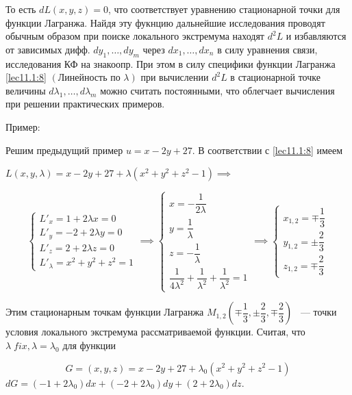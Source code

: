 \documentclass[../../main.tex]{subfiles}
\begin{document}
	То есть $dL\left( x, y, z \right) = 0$, что соответствует уравнению 
	стационарной точки для функции Лагранжа. Найдя эту фукнцию дальнейшие
	исследования проводят обычным образом при поиске локального экстремума 
	находят $d^2L$ и избавляются от зависимых дифф. $d y_1, \ldots, d y_m $ 
	через $d x_1, \ldots, d x_n$ в силу уравнения связи, исследования КФ на 
	знакоопр. При этом в силу специфики функции Лагранжа \eqref{lec11.1:8} 
	$\left( \text{Линейность по } \lambda \right) $ при вычислении $d^2 L$
	в стационарной точке величины $d \lambda_1, \ldots, d \lambda_m$ можно
	считать постоянными, что облегчает вычисления при решении практических
	примеров.
	
	\begin{exmp}
		Пример:
	\end{exmp}
	
	Решим предыдущий пример $u = x - 2y + 27$. В 
	соответствии с \eqref{lec11.1:8} имеем 
	
	$L \left( x, y, \lambda \right) = x - 2y + 27 + \lambda \left( x^2 + y^2 
	+ z^2 - 1 \right) \implies$ 
	
	\[
	\begin{cases}
	L'_x = 1 + 2 \lambda x = 0 \\
	L'_y = -2 + 2 \lambda y = 0 \\
	L'_z = 2 + 2 \lambda z = 0 \\
	L'_\lambda = x^2 + y^2 + z^2 = 1
	\end{cases} \implies
	\begin{cases}
	x = -\dfrac{1}{2\lambda} \\
	y = \dfrac{1}{\lambda} \\
	z = -\dfrac{1}{\lambda} \\
	\dfrac{1}{4\lambda^2} + \dfrac{1}{\lambda^2} + \dfrac{1}{\lambda^2} = 1
	\end{cases} \implies
	\begin{cases}
	x_{1, 2} = \mp \dfrac{1}{3} \\
	y_{1, 2} = \pm \dfrac{2}{3} \\
	z_{1, 2} = \mp \dfrac{2}{3} 
	\end{cases}
	\]
	
	Этим стационарным точкам функции Лагранжа $M_{1, 2} \left( \mp \dfrac{1}{3}, 
	\pm \dfrac{2}{3}, \mp \dfrac{2}{3} \right) $ ~--- точки условия локального
	экстремума рассматриваемой функции. Считая, что $\lambda\; fix, 
	\lambda = \lambda_0$ для функции
	
	\[G = \left( x, y, z \right) = x - 2y + 27 + 
	\lambda_0\left( x^2 + y^2 + z^2 - 1 \right)\]
	$
	dG = \left( -1 + 2 \lambda_0 \right)dx + \left( -2 + 2\lambda_0 \right)dy 
	+ \left( 2 + 2 \lambda_0 \right) dz $.
	\smallskip
	
\end{document}
